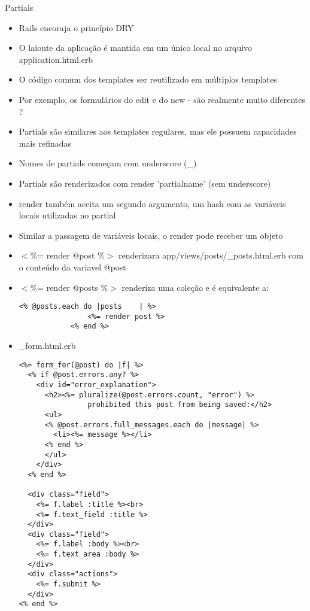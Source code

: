 \begin{frame}{Partials}
	\begin{itemize}
		\item Rails encoraja o princípio \alert{DRY}	
		\item O laioute da aplicação é mantida em um único local no arquivo \alert{application.html.erb}
		\item O código comum dos templates ser reutilizado em \alert{múltiplos templates}
		\item Por exemplo, os formulários do \alert{edit} e do \alert{new} - são realmente muito diferentes ?
		\item Partials são similares aos templates regulares, mas ele possuem capacidades mais \alert{refinadas}
		\item Nomes de partials começam com \alert{underscore} (\_) 
		\item Partials são renderizados com \alert{render 'partialname'} (sem underscore)
		\item \alert{render} também aceita um segundo argumento, um hash com as variáveis locais utilizadas no partial
		\item Similar a passagem de variáveis locais, o \alert{render} pode receber um objeto
		\item \alert{$<$\%= render @post \%$>$} renderizara \alert{app/views/posts/\_posts.html.erb} com o conteúdo da variavel @post
		\item \alert{$<$\%= render @posts \%$>$} renderiza uma coleção e é equivalente a:
		\begin{lstlisting}[style=RubyInputStyle, caption=controllers/posts\_controller.rb]
			<% @posts.each do |posts	| %> 
				<%= render post %>
			<% end %>
		\end{lstlisting}		
		\framebreak
		\item \alert{\_form.html.erb}
		\begin{lstlisting}[style=RubyInputStyle, caption=views/posts/\_form.html.erb]
<%= form_for(@post) do |f| %>
  <% if @post.errors.any? %>
    <div id="error_explanation">
      <h2><%= pluralize(@post.errors.count, "error") %> 
			    prohibited this post from being saved:</h2>
      <ul>
      <% @post.errors.full_messages.each do |message| %>
        <li><%= message %></li>
      <% end %>
      </ul>
    </div>
  <% end %>

  <div class="field">
    <%= f.label :title %><br>
    <%= f.text_field :title %>
  </div>
  <div class="field">
    <%= f.label :body %><br>
    <%= f.text_area :body %>
  </div>
  <div class="actions">
    <%= f.submit %>
  </div>
<% end %>		
		\end{lstlisting}
	\end{itemize}	
\end{frame}


